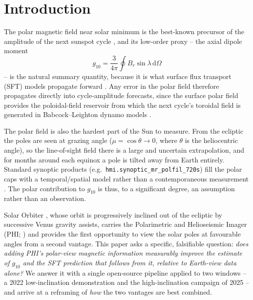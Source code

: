 \documentclass{aa}
\begin{document}


\maketitle

\section{Introduction}
\label{sec:introduction}

The polar magnetic field near solar minimum is the best-known precursor of the amplitude of the next sunspot cycle \citep{Svalgaard2005,Petrovay2020}, and its low-order proxy -- the axial dipole moment
\begin{equation}
    g_{10} = \frac{3}{4\pi} \oint B_r \sin\lambda \, \mathrm{d}\Omega
    \label{eq:g10-intro}
\end{equation}
-- is the natural summary quantity, because it is what surface flux transport (SFT) models propagate forward \citep{Babcock1961,Leighton1969,Sheeley2005,WangSheeley1991,Wang2017}. Any error in the polar field therefore propagates directly into cycle-amplitude forecasts, since the surface polar field provides the poloidal-field reservoir from which the next cycle's toroidal field is generated in Babcock--Leighton dynamo models \citep{CameronSchussler2015}.

The polar field is also the hardest part of the Sun to measure. From the ecliptic the poles are seen at grazing angle ($\mu = \cos\theta \to 0$, where $\theta$ is the heliocentric angle), so the line-of-sight field there is a large and uncertain extrapolation, and for months around each equinox a pole is tilted away from Earth entirely. Standard synoptic products (e.g.\ \texttt{hmi.synoptic\_mr\_polfil\_720s}) fill the polar caps with a temporal/spatial model rather than a contemporaneous measurement \citep{Sun2018}. The polar contribution to $g_{10}$ is thus, to a significant degree, an assumption rather than an observation.

Solar Orbiter \citep{Muller2020}, whose orbit is progressively inclined out of the ecliptic by successive Venus gravity assists, carries the Polarimetric and Helioseismic Imager (PHI; \citealp{Solanki2020}) and provides the first opportunity to view the solar poles at favourable angles from a second vantage. This paper asks a specific, falsifiable question: \emph{does adding PHI's polar-view magnetic information measurably improve the estimate of $g_{10}$ and the SFT prediction that follows from it, relative to Earth-view data alone?} We answer it with a single open-source pipeline applied to two windows -- a 2022 low-inclination demonstration and the high-inclination campaign of 2025 -- and arrive at a reframing of \emph{how} the two vantages are best combined.
\end{document}
